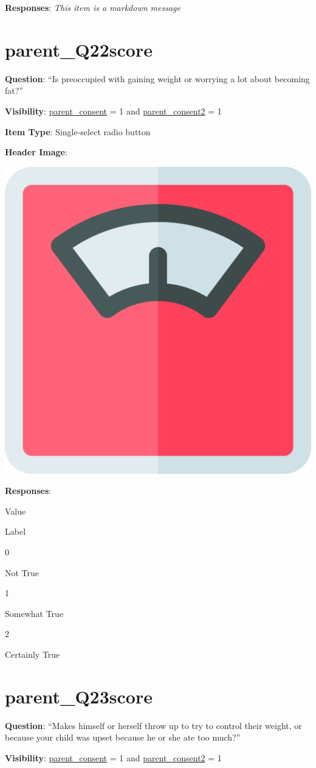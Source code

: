 \documentclass[]{book}
\begin{document}
\textbf{Responses}: \emph{This item is a markdown message}

\hypertarget{parent_q22score}{%
\section{parent\_Q22score}\label{parent_q22score}}

\textbf{Question}: ``Is preoccupied with gaining weight or worrying a lot about becoming fat?''

\textbf{Visibility}: \protect\hyperlink{parent_consent}{parent\_consent} = 1 and \protect\hyperlink{parent_consent2}{parent\_consent2} = 1

\textbf{Item Type}: Single-select radio button

\textbf{Header Image}:

\begin{flushleft}\includegraphics[width=0.33\linewidth]{downloadFigs4latex_HBN_PMHS_Codebook/parent_Q22score_headerImg} \end{flushleft}

\textbf{Responses}:

Value

Label

0

Not True

1

Somewhat True

2

Certainly True

\hypertarget{parent_q23score}{%
\section{parent\_Q23score}\label{parent_q23score}}

\textbf{Question}: ``Makes himself or herself throw up to try to control their weight, or because your child was upset because he or she ate too much?''

\textbf{Visibility}: \protect\hyperlink{parent_consent}{parent\_consent} = 1 and \protect\hyperlink{parent_consent2}{parent\_consent2} = 1
\end{document}
